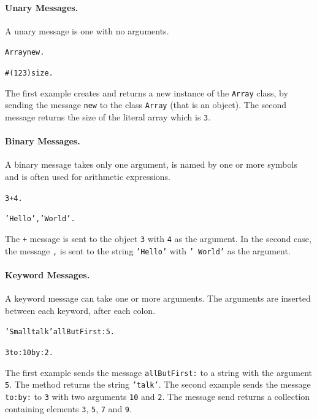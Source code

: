 \documentclass[notumble]{leaflet}
\makeatletter
\newenvironment{displaycode}{%
        \begin{lrbox}{\code@box}%
                \begin{minipage}{\linewidth}
                        \begin{alltt}\small
}{
                        \end{alltt}
                \end{minipage}
        \end{lrbox}
        \colorbox{light-gray}{\usebox{\code@box}}
}
\newcommand{\code}[1]{\foreignlanguage{english}{\texttt{#1}}}
\makeatother
\begin{document}
\paragraph{Unary Messages.}

A unary message is one with no arguments.

\begin{displaycode}
Array new.

#(1 2 3) size.
\end{displaycode}

The first example creates and returns a new instance of the
\code{Array} class, by sending the message \code{new} to the class
\code{Array} (that is an object). The second message returns the size
of the literal array which is \code{3}.

\paragraph{Binary Messages.}

A binary message takes only one argument, is named by one or more
symbols and is often used for arithmetic expressions.

\begin{displaycode}
3 + 4.

'Hello', ' World'.
\end{displaycode}

The \code{+} message is sent to the object \code{3} with \code{4} as
the argument. In the second case, the message \code{,} is sent to the
string \code{'Hello'} with \code{' World'} as the argument.

\paragraph{Keyword Messages.}


A keyword message can take one or more arguments. The arguments are
inserted between each keyword, after each colon.

\begin{displaycode}
'Smalltalk' allButFirst: 5.

3 to: 10 by: 2.
\end{displaycode}

The first example sends the message \code{allButFirst:} to a string
with the argument \code{5}. The method returns the string
\code{'talk'}. The second example sends the message \code{to:by:} to
\code{3} with two arguments \code{10} and \code{2}. The message send
returns a collection containing elements \code{3}, \code{5}, \code{7}
and \code{9}.
\end{document}
